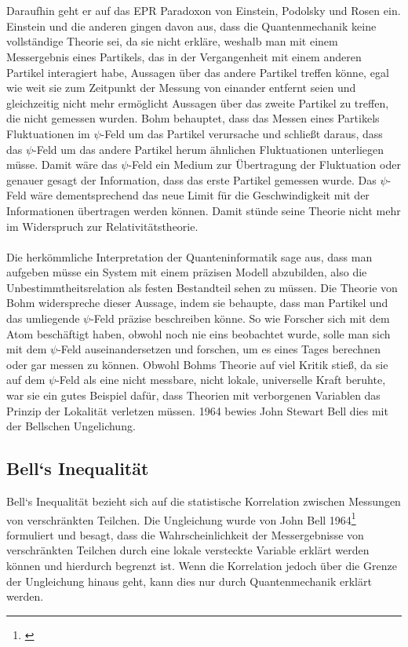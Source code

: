 \\\\
Daraufhin geht er auf das EPR Paradoxon von Einstein, Podolsky und Rosen ein. Einstein und die anderen gingen davon aus, dass die Quantenmechanik keine vollständige Theorie sei, da sie nicht erkläre, weshalb man mit einem Messergebnis eines Partikels, das in der Vergangenheit mit einem anderen Partikel interagiert habe, Aussagen über das andere Partikel treffen könne, egal wie weit sie zum Zeitpunkt der Messung von einander entfernt seien und gleichzeitig nicht mehr ermöglicht Aussagen über das zweite Partikel zu treffen, die nicht gemessen wurden. Bohm behauptet, dass das Messen eines Partikels Fluktuationen im $\psi$-Feld um das Partikel verursache und schließt daraus, dass das $\psi$-Feld um das andere Partikel herum ähnlichen Fluktuationen unterliegen müsse. Damit wäre das $\psi$-Feld ein Medium zur Übertragung der Fluktuation oder genauer gesagt der Information, dass das erste Partikel gemessen wurde. Das $\psi$-Feld wäre dementsprechend das neue Limit für die Geschwindigkeit mit der Informationen übertragen werden können. Damit stünde seine Theorie nicht mehr im Widerspruch zur Relativitätstheorie.\\\\
Die herkömmliche Interpretation der Quanteninformatik sage aus, dass man aufgeben müsse ein System mit einem präzisen Modell abzubilden, also die Unbestimmtheitsrelation als festen Bestandteil sehen zu müssen. Die Theorie von Bohm widerspreche dieser Aussage, indem sie behaupte, dass man Partikel und das umliegende $\psi$-Feld präzise beschreiben könne. So wie Forscher sich mit dem Atom beschäftigt haben, obwohl noch nie eins beobachtet wurde, solle man sich mit dem $\psi$-Feld auseinandersetzen und forschen, um es eines Tages berechnen oder gar messen zu können.
Obwohl Bohms Theorie auf viel Kritik stieß, da sie auf dem $\psi$-Feld als eine nicht messbare, nicht lokale, universelle Kraft beruhte, war sie ein gutes Beispiel dafür, dass Theorien mit verborgenen Variablen das Prinzip der Lokalität verletzen müssen. 1964 bewies John Stewart Bell dies mit der Bellschen Ungelichung.


\subsection{Bell`s Inequalität}
\label{subsec:bells_inequality}
Bell`s Inequalität bezieht sich auf die statistische Korrelation zwischen Messungen von verschränkten Teilchen.
Die Ungleichung wurde von John Bell 1964\footnote{\cite{bell_einstein_1964}} formuliert und besagt, dass die Wahrscheinlichkeit der Messergebnisse von verschränkten Teilchen durch eine lokale versteckte Variable erklärt werden können und hierdurch begrenzt ist.
Wenn die Korrelation jedoch über die Grenze der Ungleichung hinaus geht, kann dies nur durch Quantenmechanik erklärt werden.\\

